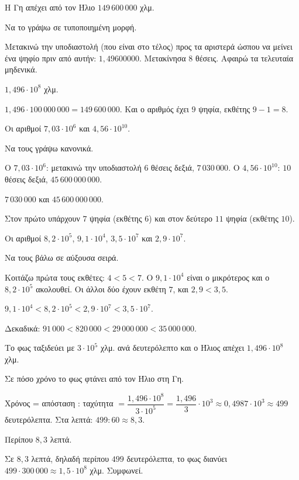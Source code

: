 
\tixero Η Γη απέχει από τον Ήλιο $149\,600\,000$ χλμ.\par
\tithelo Να το γράψω σε τυποποιημένη μορφή.\par
\possindeo Μετακινώ την υποδιαστολή (που είναι στο τέλος) προς τα αριστερά ώσπου να μείνει ένα ψηφίο πριν από αυτήν: $1{,}49600000$. Μετακίνησα $8$ θέσεις. Αφαιρώ τα τελευταία μηδενικά.\par
\apantisi $1{,}496\cdot10^8$ χλμ.\par
\elegxos $1{,}496\cdot100\,000\,000=149\,600\,000$. Και ο αριθμός έχει $9$ ψηφία, εκθέτης $9-1=8$.

\tixero Οι αριθμοί $7{,}03\cdot10^6$ και $4{,}56\cdot10^{10}$.\par
\tithelo Να τους γράψω κανονικά.\par
\possindeo Ο $7{,}03\cdot10^6$: μετακινώ την υποδιαστολή $6$ θέσεις δεξιά, $7\,030\,000$. Ο $4{,}56\cdot10^{10}$: $10$ θέσεις δεξιά, $45\,600\,000\,000$.\par
\apantisi $7\,030\,000$ και $45\,600\,000\,000$.\par
\elegxos Στον πρώτο υπάρχουν $7$ ψηφία (εκθέτης $6$) και στον δεύτερο $11$ ψηφία (εκθέτης $10$).

\tixero Οι αριθμοί $8{,}2\cdot10^5$, $9{,}1\cdot10^4$, $3{,}5\cdot10^7$ και $2{,}9\cdot10^7$.\par
\tithelo Να τους βάλω σε αύξουσα σειρά.\par
\possindeo Κοιτάζω πρώτα τους εκθέτες: $4<5<7$. Ο $9{,}1\cdot10^4$ είναι ο μικρότερος και ο $8{,}2\cdot10^5$ ακολουθεί. Οι άλλοι δύο έχουν εκθέτη $7$, και $2{,}9<3{,}5$.\par
\apantisi $9{,}1\cdot10^4<8{,}2\cdot10^5<2{,}9\cdot10^7<3{,}5\cdot10^7$.\par
\elegxos Δεκαδικά: $91\,000<820\,000<29\,000\,000<35\,000\,000$.

\tixero Το φως ταξιδεύει με $3\cdot10^5$ χλμ. ανά δευτερόλεπτο και ο Ήλιος απέχει $1{,}496\cdot10^8$ χλμ.\par
\tithelo Σε πόσο χρόνο το φως φτάνει από τον Ήλιο στη Γη.\par
\possindeo Χρόνος = απόσταση : ταχύτητα $=\dfrac{1{,}496\cdot10^8}{3\cdot10^5}=\dfrac{1{,}496}{3}\cdot10^3\approx0{,}4987\cdot10^3\approx499$ δευτερόλεπτα. Στα λεπτά: $499:60\approx8{,}3$.\par
\apantisi Περίπου $8{,}3$ λεπτά.\par
\elegxos Σε $8{,}3$ λεπτά, δηλαδή περίπου $499$ δευτερόλεπτα, το φως διανύει $499\cdot300\,000\approx1{,}5\cdot10^8$ χλμ. Συμφωνεί.

